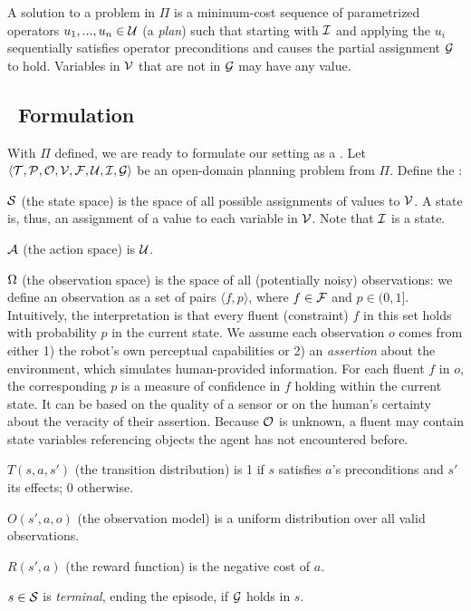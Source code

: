 A solution to a problem in $\Pi$ is a minimum-cost sequence of
parametrized operators $u_{1}, ..., u_{n} \in \mathcal{U}$ (a \emph{plan}) such
that starting with $\mathcal{I}$ and applying the $u_{i}$ sequentially
satisfies operator preconditions and causes the partial assignment
$\mathcal{G}$ to hold. Variables in $\mathcal{V}$ that are not in $\mathcal{G}$ may have any
value.

\subsection{\pomdp\ Formulation}
With $\Pi$ defined, we are ready to formulate our setting as a
\pomdp. Let $\langle \mathcal{T}, \mathcal{P}, \mathcal{O}, \mathcal{V}, \mathcal{F}, \mathcal{U}, \mathcal{I}, \mathcal{G} \rangle$ be an
open-domain planning problem from $\Pi$. Define the \pomdp:
\begin{tightlist}
\item $\mathcal{S}$ (the state space) is the space of all possible assignments
  of values to $\mathcal{V}$. A state is, thus, an assignment of a value to
  each variable in $\mathcal{V}$. Note that $\mathcal{I}$ is a state.
\item $\mathcal{A}$ (the action space) is $\mathcal{U}$.
\item $\Omega$ (the observation space) is the space of all (potentially
  noisy) observations: we define an observation as a set of pairs
  $\langle f, p \rangle$, where $f \in \mathcal{F}$ and $p \in (0,
  1]$. Intuitively, the interpretation is that every fluent (constraint) $f$ in this
  set holds with probability $p$ in the current state. We assume each
  observation $o$ comes from either 1) the robot's own perceptual
  capabilities or 2) an \emph{assertion} about the environment, which
  simulates human-provided information. For each fluent $f$ in $o$,
  the corresponding $p$ is a measure of confidence in $f$ holding within the
  current state. It can be based on the quality of a sensor or on the
  human's certainty about the veracity of their assertion. Because
  $\mathcal{O}$ is unknown, a fluent may contain state variables referencing
  objects the agent has not encountered before.
\item $T(s, a, s')$ (the transition distribution) is 1 if $s$
  satisfies $a$'s preconditions and $s'$ its effects; 0 otherwise.
\item $O(s', a, o)$ (the observation model) is a uniform distribution
  over all valid observations.
\item $R(s', a)$ (the reward function) is the negative cost of $a$.
\item $s \in \mathcal{S}$ is \emph{terminal}, ending the episode, if $\mathcal{G}$ holds in $s$.
\end{tightlist}

